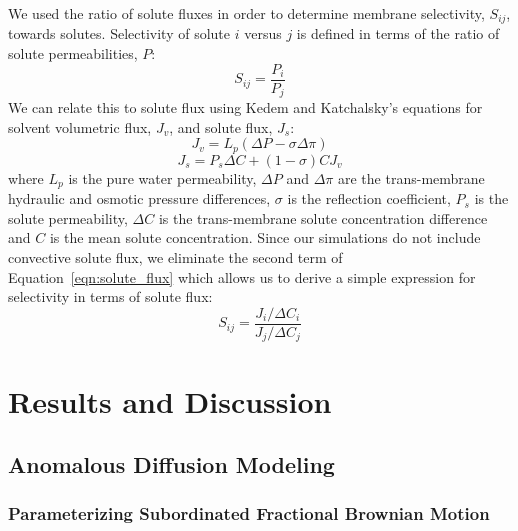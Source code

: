 \documentclass[aps,pre,preprint,groupedaddress]{revtex4-2}
\begin{document}
  We used the ratio of solute fluxes in order to determine membrane selectivity, $S_{ij}$,
  towards solutes. Selectivity of solute $i$ versus $j$ is defined in terms of the
  ratio of solute permeabilities, $P$:~\cite{guo_pervaporation_2004}
  \begin{equation}
  S_{ij} = \frac{P_i}{P_j}
  \end{equation}
  We can relate this to solute flux using Kedem and Katchalsky's equations for 
  solvent volumetric flux, $J_v$, and solute flux, $J_s$:~\cite{kedem_permeability_1963,al-zoubi_rejection_2007}
  \begin{equation}
  J_v = L_p(\Delta P - \sigma\Delta \pi)
  \end{equation} 
  \begin{equation}
  J_s = P_s \Delta C + (1 - \sigma)CJ_v
  \label{eqn:solute_flux}
  \end{equation}
  where $L_p$ is the pure water permeability, $\Delta P$ and $\Delta \pi$ are the 
  trans-membrane hydraulic and osmotic pressure differences, $\sigma$ is the reflection
  coefficient, $P_s$ is the solute permeability, $\Delta C$ is the trans-membrane
  solute concentration difference and $C$ is the mean solute concentration. Since our
  simulations do not include convective solute flux, we eliminate the second term 
  of Equation~\ref{eqn:solute_flux} which allows us to derive a simple expression
  for selectivity in terms of solute flux:
  \begin{equation}
  S_{ij} = \frac{J_i / \Delta C_i}{J_j / \Delta C_j}
  \label{eqn:selectivity}
  \end{equation}
  
  \section{Results and Discussion}
  
  \subsection{Anomalous Diffusion Modeling}\label{section:sFBM}
  
  \subsubsection{Parameterizing Subordinated Fractional Brownian Motion}\label{section:AD_parameterization}
\end{document}
